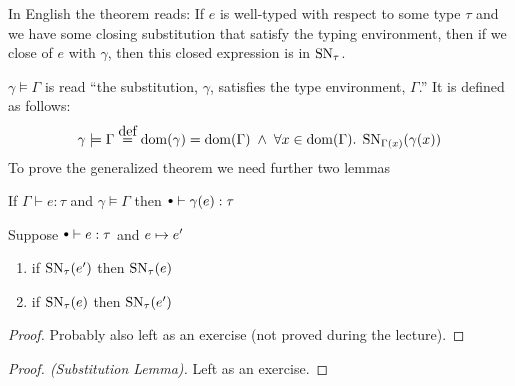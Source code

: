 In English the theorem reads: If $e$ is well-typed with respect to some type $\tau$ and we have some closing substitution that satisfy the typing environment, then if we close of $e$ with $\gamma$, then this closed expression is in $\operatorname{SN}_\tau$.

$\gamma \models \Gamma$ is read ``the substitution, $\gamma$, satisfies the type environment, $\Gamma$.'' It is defined as follows:
\[
  \gamma \models \Gamma \eqdef \dom(\gamma) = \dom(\Gamma) \pand 
                 \forall x \in \dom(\Gamma). \; \SN{\Gamma(x)}{\gamma(x)}
\]
To prove the generalized theorem we need further two lemmas
\begin{substlem}
  If $\Gamma \vdash e : \tau$ and $\gamma \models \Gamma$ then $\mtenv \vdash \gamma (e) : \tau$
\end{substlem}
\begin{forback}
  Suppose $\mtenv \vdash e : \tau$ and $e \mapsto e'$
  \begin{enumerate}
  \item if $\operatorname{SN}_{\tau}(e')$ then $\operatorname{SN}_{\tau}(e)$
  \item if $\operatorname{SN}_{\tau}(e)$ then $\operatorname{SN}_{\tau}(e')$
  \end{enumerate}
\end{forback}
\begin{proof}
  Probably also left as an exercise (not proved during the lecture).
\end{proof}
\begin{proof}[Proof. (Substitution Lemma)] 
  Left as an exercise.
\end{proof}
